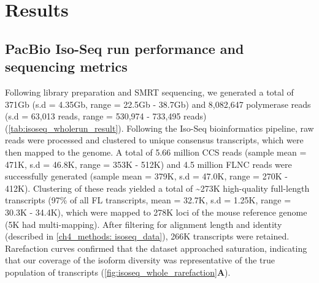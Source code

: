 \newpage
\section{Results}

\subsection{PacBio Iso-Seq run performance and sequencing metrics}
Following library preparation and SMRT sequencing, we generated a total of 371Gb (s.d = 4.35Gb, range = 22.5Gb - 38.7Gb) and 8,082,647 polymerase reads (s.d = 63,013 reads, range = 530,974 - 733,495 reads) (\cref{tab:isoseq_wholerun_result}). Following the Iso-Seq bioinformatics pipeline, raw reads were processed and clustered to unique consensus transcripts, which were then mapped to the genome. A total of 5.66 million CCS reads (sample mean = 471K, s.d = 46.8K, range =  353K - 512K) and 4.5 million FLNC reads were successfully generated (sample mean = 379K, s.d = 47.0K, range = 270K - 412K). Clustering of these reads yielded a total of \textasciitilde273K high-quality full-length transcripts (97\% of all FL transcripts, mean = 32.7K, s.d = 1.25K, range = 30.3K - 34.4K), which were mapped to 278K loci of the mouse reference genome (5K had multi-mapping). After filtering for alignment length and identity (described in \cref{ch4_methods: isoseq_data}), 266K transcripts were retained. Rarefaction curves confirmed that the dataset approached saturation, indicating that our coverage of the isoform diversity was representative of the true population of transcripts (\cref{fig:isoseq_whole_rarefaction}\textbf{A}). 

